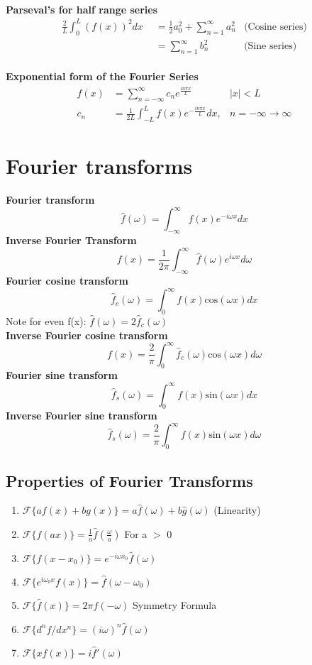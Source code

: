 \documentclass{article}
\newcommand{\f}{\mathcal{F}}
\begin{document}
\\
\textbf{Parseval's for half range series}
\begin{align*}
    \frac{2}{L}\int_{0}^L (f(x))^2 dx \hspace{5pt} &= \frac{1}{2}a_0^2 + \sum_{n=1}^\infty a_n^2 & \text{(Cosine series)}\\
    &=  \sum_{n=1}^\infty  b_n^2 & \text{(Sine series)}
\end{align*}
\\
\textbf{Exponential form of the Fourier Series}
\\
\begin{align*}
    f(x) &= \sum_{n=-\infty}^\infty c_n e^{\frac{in\pi x}{L}} & |x| < L \\
    c_n &= \frac{1}{2L}\int_{-L}^{L} f(x) e^{-\frac{in\pi x}{L}} dx, & n = -\infty \to \infty
\end{align*}
\section{Fourier transforms}
\textbf{Fourier transform}
$$
\hat{f}(\omega) = \int_{-\infty}^\infty f(x)e^{-i\omega x}dx
$$
\textbf{Inverse Fourier Transform}
$$
f(x) = \frac{1}{2\pi}\int_{-\infty}^\infty \hat{f}(\omega)e^{i\omega x}d\omega
$$
\textbf{Fourier cosine transform}
$$
\hat{f}_c(\omega) = \int_{0}^\infty f(x)\text{cos}(\omega x)dx
$$
Note for even f(x): $\hat{f}(\omega) = 2\hat{f}_c(\omega)$ \\
\textbf{Inverse Fourier cosine transform}
$$
 f(x)= \frac{2}{\pi}\int_{0}^\infty \hat{f}_c(\omega)\text{cos}(\omega x)d\omega
$$
\textbf{Fourier sine transform}
$$
\hat{f}_s(\omega) = \int_{0}^\infty f(x)\text{sin}(\omega x)dx
$$
\textbf{Inverse Fourier sine transform}
$$
\hat{f}_s(\omega) = \frac{2}{\pi} \int_{0}^\infty f(x)\text{sin}(\omega x)d\omega
$$
\subsection{Properties of Fourier Transforms}
\begin{enumerate}
    \item $\mathcal{F} \{ af(x) +bg(x) \} = a\hat{f}(\omega) + b\hat{g}(\omega) $ \hspace{6pt} (Linearity)
    \item $\f \{ f(ax) \} = \frac{1}{a} \hat{f}(\frac{\omega}{a}) $ \hspace{6pt} For a $>$ 0
    \item $\f \{ f(x-x_0) \} = e^{-i\omega x_0} \hat{f} (\omega)$
    \item $\f \{e^{i\omega_0 x}f(x) \} = \hat{f}(\omega-\omega_0) $
    \item $\f \{ \hat{f} (x) \} = 2\pi f(-\omega)$ \hspace{6pt} Symmetry Formula
    \item $\f \{ d^n f / d x^n \} = (i\omega)^n \hat{f}(\omega) $
    \item $\f \{ xf(x) \} = i \hat{f}' (\omega) $
\end{enumerate}
\end{document}
